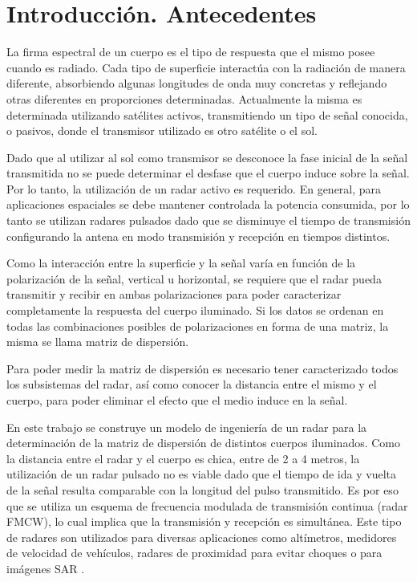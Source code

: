 \chapter{Introducción. Antecedentes} \label{ch:introduction}


La firma espectral de un cuerpo es el tipo de respuesta que el mismo posee cuando es radiado. Cada tipo de superficie interactúa con la radiación de manera diferente, absorbiendo algunas longitudes de onda muy concretas y reflejando otras diferentes en proporciones determinadas. Actualmente la misma es determinada utilizando satélites activos, transmitiendo un tipo de señal conocida, o pasivos, donde el transmisor utilizado es otro satélite o el sol. 

Dado que al utilizar al sol como transmisor se desconoce la fase inicial de la señal transmitida no se puede determinar el desfase que el cuerpo induce sobre la señal. Por lo tanto, la utilización de un radar activo es requerido. En general, para aplicaciones espaciales se debe mantener controlada la potencia consumida, por lo tanto se utilizan radares pulsados dado que se disminuye el tiempo de transmisión configurando la antena en modo transmisión y recepción en tiempos distintos.

Como la interacción entre la superficie y la señal varía en función de la polarización de la señal, vertical u horizontal, se requiere que el radar pueda transmitir y recibir en ambas polarizaciones para poder caracterizar completamente la respuesta del cuerpo iluminado. Si los datos se ordenan en todas las combinaciones posibles de polarizaciones en forma de una matriz, la misma se llama matriz de dispersión.

Para poder medir la matriz de dispersión es necesario tener caracterizado todos los subsistemas del radar, así como conocer la distancia entre el mismo y el cuerpo, para poder eliminar el efecto que el medio induce en la señal. 

En este trabajo se construye un modelo de ingeniería de un radar para la determinación de la matriz de dispersión de distintos cuerpos iluminados. Como la distancia entre el radar y el cuerpo es chica, entre de 2 a 4 metros, la utilización de un radar pulsado no es viable dado que el tiempo de ida y vuelta de la señal resulta comparable con la longitud del pulso transmitido. Es por eso que se utiliza un esquema de frecuencia modulada de transmisión continua (radar FMCW), lo cual implica que la transmisión y recepción es simultánea. Este tipo de radares son utilizados para diversas aplicaciones como altímetros, medidores de velocidad de vehículos, radares de proximidad para evitar choques o para imágenes SAR \cite{Richards2010}.

